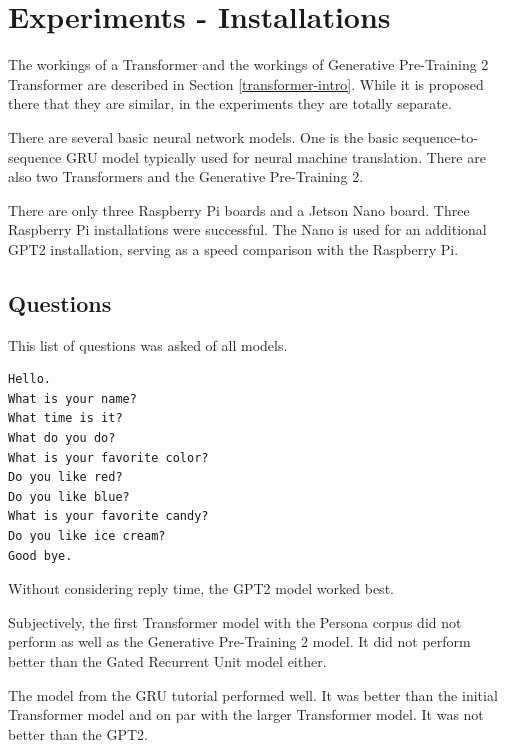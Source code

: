 

\section{Experiments - Installations}
The workings of a Transformer and the workings of Generative Pre-Training 2 Transformer are described in Section \ref{transformer-intro}. While it is proposed there that they are similar, in the experiments they are totally separate.

There are several basic neural network models. One is the basic sequence-to-sequence GRU model typically used for neural machine translation. There are also two Transformers and the Generative Pre-Training 2. %

There are only three Raspberry Pi boards and a Jetson Nano board. %
Three Raspberry Pi installations were successful. The Nano is used for an additional GPT2 installation, serving as a speed comparison with the Raspberry Pi. 


\subsection{Questions}
This list of questions was asked of all models. %

\begin{verbatim}
Hello.
What is your name? 
What time is it?
What do you do?
What is your favorite color?
Do you like red?
Do you like blue?
What is your favorite candy?
Do you like ice cream?
Good bye.
\end{verbatim}

Without considering reply time, the GPT2 model worked best. 

Subjectively, the first Transformer model with the Persona corpus did not perform as well as the Generative Pre-Training 2 model. It did not perform better than the Gated Recurrent Unit model either. 

The model from the GRU tutorial performed well. It was better than the initial Transformer model and on par with the larger Transformer model. It was not better than the GPT2.



